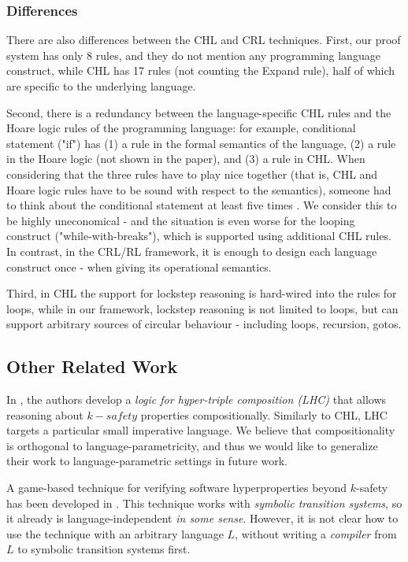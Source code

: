 \subsubsection{Differences}
There are also differences between the CHL and CRL techniques.
First, our proof system has only 8 rules, and they do not mention any programming language construct,
while CHL has 17 rules (not counting the Expand rule), half of which are specific to the underlying language.

Second, there is a redundancy between the language-specific CHL rules and the Hoare logic rules of the
programming language: for example, conditional statement ("if") has (1) a rule in the formal semantics of the language,
(2) a rule in the Hoare logic (not shown in the paper), and (3) a rule in CHL.
When considering that the three rules have to play nice together (that is, CHL and Hoare logic rules have to be sound with respect to the semantics), someone had to think about the conditional statement at least five times .
We consider this to be highly uneconomical
- and the situation
is even worse for the looping construct ("while-with-breaks"), which is supported using additional CHL rules.
In contrast, in the CRL/RL framework, it is enough to design each language construct once - when giving
its operational semantics.

Third, in CHL the support for lockstep reasoning is hard-wired into the rules for loops,
while in our framework, lockstep reasoning is not limited to loops, but can support arbitrary sources
of circular behaviour - including loops, recursion, gotos.

\subsection{Other Related Work}

In \cite{DOsualdoFD22}, the authors develop a \emph{logic for hyper-triple composition (LHC)}
that allows reasoning about $k-safety$ properties compositionally.
Similarly to CHL, LHC targets a particular small imperative language.
We believe that compositionality is orthogonal to language-parametricity,
and thus we would like to generalize their work to language-parametric settings in future work.

A game-based technique for verifying software hyperproperties beyond $k$-safety
has been developed in \cite{BeutnerF22}.
This technique works with \emph{symbolic transition systems},
so it already is language-independent \emph{in some sense}. However, it is not clear how to use the technique
with an arbitrary language $L$, without writing a \emph{compiler} from $L$ to symbolic transition systems first.

